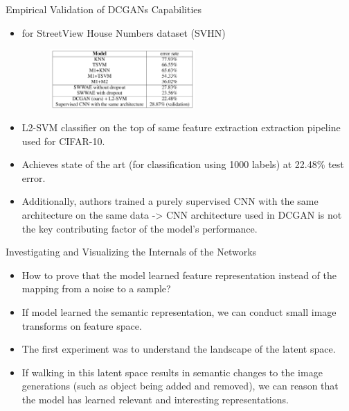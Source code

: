 \documentclass[10pt]{beamer}
\begin{document}
	\begin{frame}{Empirical Validation of DCGANs Capabilities}
		\begin{itemize}
			\item for StreetView House Numbers dataset (SVHN)
			\begin{figure}
				\includegraphics[width=15em]{figures/DCGAN-discriminator-feature-extractor-svhn.png}
			\end{figure}
			\pause
			\item L2-SVM classifier on the top of same feature extraction extraction pipeline used for CIFAR-10.
			\pause
			\item Achieves state of the art (for classification using 1000 labels) at 22.48\% test error.
			\pause
			\item Additionally, authors trained a purely supervised CNN with the same architecture on the same data -> CNN architecture used in DCGAN is not the key contributing factor of the model's performance.
		\end{itemize}
	\end{frame}

	\begin{frame}{Investigating and Visualizing the Internals of the Networks}
		\begin{itemize}
			\item How to prove that the model learned feature representation instead of the mapping from a noise to a sample?
			\pause
			\item If model learned the semantic representation, we can conduct small image transforms on feature space.
			\pause
			\item The first experiment was to understand the landscape of the latent space.
			\pause
			\item If walking in this latent space results in semantic changes to the image generations (such as object being added and removed), we can reason that the model has learned relevant and interesting representations.
		\end{itemize}
	\end{frame}
\end{document}
